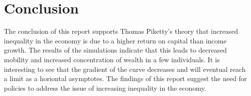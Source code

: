 \documentclass{article}
\begin{document}
\vspace{-0.4cm}
\section*{Conclusion}
\vspace{-0.3cm}
The conclusion of this report supports Thomas Piketty's theory that increased inequality in the economy is due to a higher
return on capital than income growth.
The results of the simulations indicate that this leads to decreased mobility and increased 
concentration of wealth in a few individuals. It is interesting to see that the gradient of the curve decreases and will eventual reach a limit as a horiontal asymptotes. The findings of this report suggest the need for policies to 
address the issue of increasing inequality in the economy.
\end{document}
